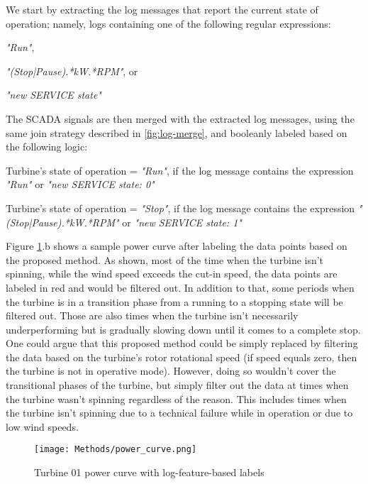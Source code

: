       We start by extracting the log messages that report the current state of operation; namely, logs containing one of the following regular expressions:
      \begin{bulletList}
        \item \emph{"Run"},
        \item \emph{"(Stop|Pause).*kW.*RPM"}, or
        \item \emph{"new SERVICE state"}
      \end{bulletList}
      The SCADA signals are then merged with the extracted log messages, using the same join strategy described in \ref{fig:log-merge}, and booleanly labeled based on the following logic:
      \begin{bulletList}
        \item Turbine's state of operation = \emph{"Run"}, if the log message contains the expression \emph{"Run"} or \emph{"new SERVICE state: 0"}
        \item Turbine's state of operation = \emph{"Stop"}, if the log message contains the expression \emph{"(Stop|Pause).*kW.*RPM"} or \emph{"new SERVICE state: 1"}
      \end{bulletList}

      Figure \ref{fig:power_curve}.b shows a sample power curve after labeling the data points based on the proposed method. 
      As shown, most of the time when the turbine isn't spinning, while the wind speed exceeds the cut-in speed, the data points are labeled 
      in red and would be filtered out. In addition to that, some periods when the turbine is in a transition phase from a running to a stopping state 
      will be filtered out. Those are also times when the turbine isn't necessarily underperforming but is gradually slowing down until it comes to a complete stop.
      One could argue that this proposed method could be simply replaced by filtering the data based on the turbine's rotor rotational speed 
      (if speed equals zero, then the turbine is not in operative mode). However, doing so wouldn't cover the transitional phases of the turbine, but simply 
      filter out the data at times when the turbine wasn't spinning regardless of the reason. This includes times when the turbine isn't spinning 
      due to a technical failure while in operation or due to low wind speeds.
      
      \begin{figure}[H]
        \begin{center}
          \texttt{[image: Methods/power\_curve.png]}
        \end{center}
        \caption{Turbine 01 power curve with log-feature-based labels}
        \label{fig:power_curve}
      \end{figure}


